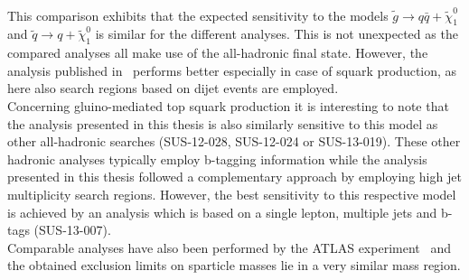 \\
This comparison exhibits that the expected sensitivity to the models $\tilde{g} \rightarrow q\bar{q} + \tilde{\chi}_1^0$ and $\tilde{q} \rightarrow q + \tilde{\chi}_1^0$ is similar for the different analyses. This is not unexpected as the compared analyses all make use of the all-hadronic final state. However, the analysis published in~\cite{CMS-PAS-SUS-13-019} performs better especially in case of squark production, as here also search regions based on dijet events are employed. \\
Concerning gluino-mediated top squark production it is interesting to note that the analysis presented in this thesis is also similarly sensitive to this model as other all-hadronic searches (\cf SUS-12-028, SUS-12-024 or SUS-13-019). These other hadronic analyses typically employ b-tagging information while the analysis presented in this thesis followed a complementary approach by employing high jet multiplicity search regions. However, the best sensitivity to this respective model is achieved by an analysis which is based on a single lepton, multiple jets and b-tags (SUS-13-007). 
\\
Comparable analyses have also been performed by the ATLAS experiment~\cite{Aad:2013wta, Aad:2014wea, Aad:2014lra} and the obtained exclusion limits on sparticle masses lie in a very similar mass region.


